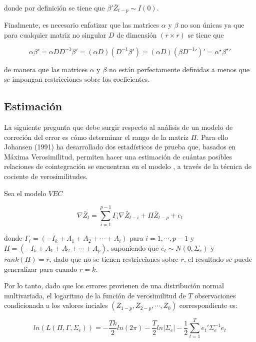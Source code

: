  donde por definición se tiene que $\beta'\bar{Z}_{t-p}\sim I(0)$.\bigskip 
 
Finalmente, es necesario enfatizar que las matrices $\alpha$ y $\beta$ no son únicas ya que para cualquier matriz no singular $D$ de dimensión $(r \times r)$ se tiene que

\begin{equation}
\alpha\beta'=\alpha DD^{-1}\beta'= \left ( \alpha D\right )\left ( D^{-1}\beta'\right )=\left ( \alpha D\right ){\left ( \beta {D^{-1}}'\right )}'=\alpha^{\star}{\beta^{\star}}'
\end{equation}
 
de manera que las matrices $\alpha$ y $\beta$ no están perfectamente definidas a menos que se impongan restricciones sobre los coeficientes.\bigskip 


 
 
 \subsection{Estimación}
  
  La siguiente pregunta que debe surgir respecto al análisis de un modelo de correción del error es cómo determinar el rango de la matriz $\Pi$. Para ello Johansen (1991) ha desarrollado dos estadísticos de prueba que, basados en Máxima Verosimilitud, permiten hacer una estimación de cuántas posibles relaciones de cointegración se encuentran en el modelo  , a través de la técnica de cociente de verosimilitudes.   \bigskip 
  
Sea el modelo $VEC$ 

   \begin{equation} 
\nabla \bar{Z}_t=\sum_{i=1}^{p-1}\Gamma_i\nabla\bar{Z}_{t-i} + \Pi\bar{Z}_{t-p}+  e_t
 \end{equation}
 

 
 donde $\Gamma_i=(-I_k +A_1+A_2+\cdots+A_i)$ para $i=1,\cdots, p-1$ y $\Pi=(-I_k + A_1 + A_2 +\cdots + A_p)$, suponiendo que $e_t \sim N(0,\Sigma_e)$ y $rank(\Pi)=r$, dado que no se tienen restricciones sobre $r$, el resultado se puede generalizar para cuando $r=k$. \bigskip 
 
 Por lo tanto, dado que los errores provienen de una distribución normal multivariada, el logaritmo de la función de verosimilitud de $T$ observaciones condicionada a los valores inciales $(\bar{Z}_{1-p}, \bar{Z}_{2-p}, \cdots, \bar{Z}_0)$ correspondiente es:
 
 \begin{equation}\label{eq:Cap5_fnverosimilitud}
 ln(L(\Pi,\Gamma, \Sigma_e))= -\frac{Tk}{2}ln(2\pi)-\frac{T}{2}ln\left | \Sigma_e \right |-\frac{1}{2}\sum_{t=1}^{T}e_t'\Sigma_e^{-1}e_t
 \end{equation}
 

